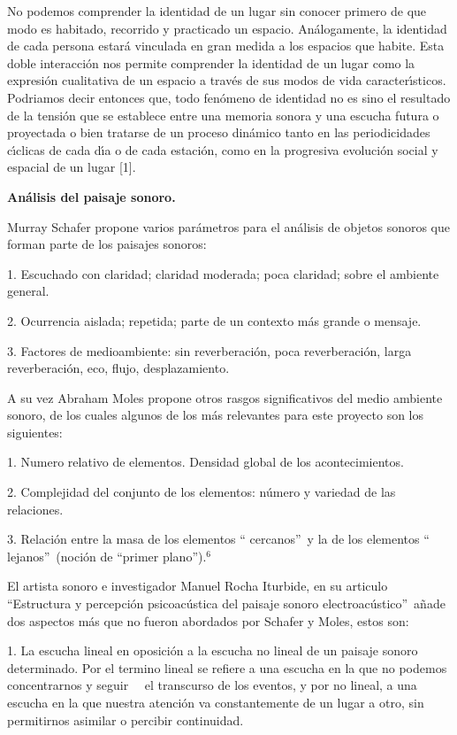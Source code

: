 No podemos comprender la identidad de un lugar sin conocer primero de que modo
es habitado, recorrido y practicado un espacio. An\'{a}logamente, la identidad
de cada persona estar\'{a} vinculada en gran medida a los espacios que habite.
Esta doble interacci\'{o}n nos permite comprender la identidad de un lugar
como la expresi\'{o}n cualitativa de un espacio a trav\'{e}s de sus modos de
vida caracter\'{\i}sticos. Podriamos decir entonces que, todo fen\'{o}meno de
identidad no es sino el resultado de la tensi\'{o}n que se establece entre una
memoria sonora y una escucha futura o proyectada o bien tratarse de un proceso
din\'{a}mico tanto en las periodicidades c\'{\i}clicas de cada d\'{\i}a o de
cada estaci\'{o}n, como en la progresiva evoluci\'{o}n social y espacial de un
lugar [1].

\textbf{ An\'{a}lisis del paisaje sonoro.}

Murray Schafer propone varios par\'{a}metros para el an\'{a}lisis de objetos
sonoros que forman parte de los paisajes sonoros:

1. Escuchado con claridad; claridad moderada; poca claridad; sobre el ambiente general.

2. Ocurrencia aislada; repetida; parte de un contexto m\'{a}s grande o mensaje.

3. Factores de medioambiente: sin reverberaci\'{o}n, poca reverberaci\'{o}n,
larga reverberaci\'{o}n, eco, flujo, desplazamiento.

A su vez Abraham Moles propone otros rasgos significativos del medio ambiente
sonoro, de los cuales algunos de los m\'{a}s relevantes para este proyecto son
los siguientes:

1. Numero relativo de elementos. Densidad global de los acontecimientos.

2. Complejidad del conjunto de los elementos: n\'{u}mero y variedad de las relaciones.

3. Relaci\'{o}n entre la masa de los elementos \textquotedblleft
cercanos\textquotedblright\ y la de los elementos \textquotedblleft
lejanos\textquotedblright\ (noci\'{o}n de \textquotedblleft primer
plano\textquotedblright).$^{6}$

El artista sonoro e investigador Manuel Rocha Iturbide, en su articulo
\textquotedblleft Estructura y percepci\'{o}n psicoac\'{u}stica del paisaje
sonoro electroac\'{u}stico\textquotedblright\ a\~{n}ade dos aspectos m\'{a}s
que no fueron abordados por Schafer y Moles, estos son:

1. La escucha lineal en oposici\'{o}n a la escucha no lineal de un paisaje
sonoro determinado. Por el termino lineal se refiere a una escucha en la que
no podemos concentrarnos y seguir \qquad\ \ el transcurso de los eventos, y
por no lineal, a una escucha en la que nuestra atenci\'{o}n va constantemente
de un lugar a otro, sin permitirnos asimilar o percibir continuidad.

